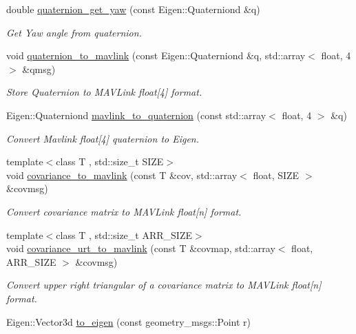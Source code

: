 \begin{DoxyCompactItemize}
double \mbox{\hyperlink{group__nodelib_ga6649411f7b10eb37f33afb1d3d67dfea}{quaternion\+\_\+get\+\_\+yaw}} (const Eigen\+::\+Quaterniond \&q)
\begin{DoxyCompactList}\small\item\em Get Yaw angle from quaternion. \end{DoxyCompactList}\item 
void \mbox{\hyperlink{group__nodelib_gac76089b997c4e184d99bec74603a35ad}{quaternion\+\_\+to\+\_\+mavlink}} (const Eigen\+::\+Quaterniond \&q, std\+::array$<$ float, 4 $>$ \&qmsg)
\begin{DoxyCompactList}\small\item\em Store Quaternion to M\+A\+V\+Link float\mbox{[}4\mbox{]} format. \end{DoxyCompactList}\item 
Eigen\+::\+Quaterniond \mbox{\hyperlink{group__nodelib_ga0f57da8dc483d45ac139607498cb5de4}{mavlink\+\_\+to\+\_\+quaternion}} (const std\+::array$<$ float, 4 $>$ \&q)
\begin{DoxyCompactList}\small\item\em Convert Mavlink float\mbox{[}4\mbox{]} quaternion to Eigen. \end{DoxyCompactList}\item 
{\footnotesize template$<$class T , std\+::size\+\_\+t S\+I\+ZE$>$ }\\void \mbox{\hyperlink{group__nodelib_ga8fc39ebb720c494bf3aad9d0ccdc8c60}{covariance\+\_\+to\+\_\+mavlink}} (const T \&cov, std\+::array$<$ float, S\+I\+ZE $>$ \&covmsg)
\begin{DoxyCompactList}\small\item\em Convert covariance matrix to M\+A\+V\+Link float\mbox{[}n\mbox{]} format. \end{DoxyCompactList}\item 
{\footnotesize template$<$class T , std\+::size\+\_\+t A\+R\+R\+\_\+\+S\+I\+ZE$>$ }\\void \mbox{\hyperlink{group__nodelib_ga70fe3c62c321522cd8786aa9ca163e2b}{covariance\+\_\+urt\+\_\+to\+\_\+mavlink}} (const T \&covmap, std\+::array$<$ float, A\+R\+R\+\_\+\+S\+I\+ZE $>$ \&covmsg)
\begin{DoxyCompactList}\small\item\em Convert upper right triangular of a covariance matrix to M\+A\+V\+Link float\mbox{[}n\mbox{]} format. \end{DoxyCompactList}\item 
Eigen\+::\+Vector3d \mbox{\hyperlink{group__nodelib_ga2bd453f7d2dafb3814b5312e788e2e35}{to\+\_\+eigen}} (const geometry\+\_\+msgs\+::\+Point r)

\end{DoxyCompactItemize}
